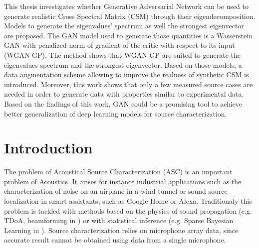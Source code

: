\documentclass[11pt,a4paper,twoside]{report}
\begin{document}
This thesis investigates whether Generative Adversarial Network can be used to generate realistic Cross Spectral Matrix (CSM) through their eigendecomposition. Models to generate the eigenvalues' spectrum as well the strongest eigenvector are proposed. The GAN model used to generate those quantities is a Wasserstein GAN with penalized norm of gradient of the critic with respect to its input (WGAN-GP). The method shows that WGAN-GP are suited to generate the eigenvalues spectrum and the strongest eigenvector. Based on those models, a data augmentation scheme allowing to improve the realness of synthetic CSM is introduced. Moreover, this work shows that only a few measured source cases are needed in order to generate data with properties similar to experimental data. Based on the findings of this work, GAN  could be a promising tool to achieve better generalization of deep learning models for source characterization.

\clearpage

\cleardoublepage

\pagestyle{fancy}
\renewcommand{\chaptermark}[1]{\markboth{#1}{}}
\renewcommand{\sectionmark}[1]{\markright{\thesection\ #1}}
\fancyhead{}

\fancyhead[LO]{\scshape \contentsname}
\fancyhead[RE]{\scshape \contentsname}
\tableofcontents

\cleardoublepage

\setcounter{chapter}{0}
\setcounter{figure}{0}
\fancyhead[LO]{\rightmark}
\fancyhead[RO]{\scshape \chaptername\ \thechapter}
\fancyhead[LE]{\scshape \chaptername\ \thechapter}
\fancyhead[RE]{\textsc{\leftmark}}


\chapter{Introduction}


The problem of Acoustical Source Characterization (ASC) is an important problem  of Acoustics. It arises for instance industrial applications such as the characterization of noise on an airplane in a wind tunnel or sound source localization in smart assistants, such as Google Home or Alexa. Traditionaly this problem is tackled with methods based on the physics of sound propagation (e.g. TDoA, beamforming in \cite{merino2019review}) or with statistical inference (e.g. Sparse Bayesian Learning in \cite{gerstoft2016multisnapshot}). Source characterization relies on microphone array data, since accurate result cannot be obtained using data from a single microphone. 
\end{document}
